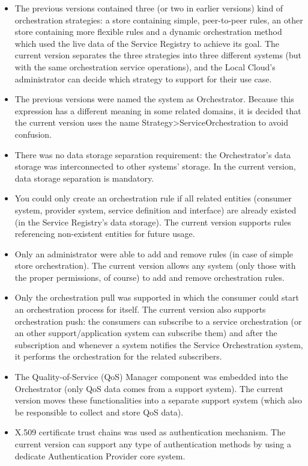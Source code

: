 \documentclass[a4paper]{arrowhead}
\begin{document}
\begin{itemize}
    \item The previous versions contained three (or two in earlier versions) kind of orchestration strategies: a store containing simple, peer-to-peer rules, an other store containing more flexible rules and a dynamic orchestration method which used the live data of the Service Registry to achieve its goal. The current version separates the three strategies into three different systems (but with the same orchestration service operations), and the Local Cloud's administrator can decide which strategy to support for their use case.
    \item The previous versions were named the system as Orchestrator. Because this expression has a different meaning in some related domains, it is decided that the current version uses the name \newline {\textless}Strategy{\textgreater}ServiceOrchestration to avoid confusion.
    \item There was no data storage separation requirement: the Orchestrator's data storage was interconnected to other systems' storage. In the current version, data storage separation is mandatory. 
    \item You could only create an orchestration rule if all related entities (consumer system, provider system, service definition and interface) are already existed (in the Service Registry's data storage). The current version supports rules referencing non-existent entities for future usage. 
    \item Only an administrator were able to add and remove rules (in case of simple store orchestration). The current version allows any system (only those with the proper permissions, of course) to add and remove orchestration rules.
    \item Only the orchestration pull was supported in which the consumer could start an orchestration process for itself. The current version also supports orchestration push: the consumers can subscribe to a service orchestration (or an other support/application system can subscribe them) and after the subscription and whenever a system notifies the Service Orchestration system, it performs the orchestration for the related subscribers.
    \item The Quality-of-Service (QoS) Manager component was embedded into the Orchestrator (only QoS data comes from a support system). The current version moves these functionalities into a separate support system (which also be responsible to collect and store QoS data).
    \item X.509 certificate trust chains was used as authentication mechanism. The current version can support any type of authentication methods by using a dedicate Authentication Provider core system. 
\end{itemize}
\end{document}
